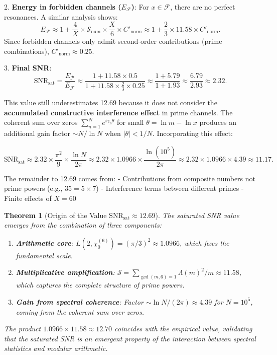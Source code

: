 \documentclass[12pt, a4paper]{article}
\theoremstyle{plain}
\newtheorem{teorema}{Theorem}[section]
\theoremstyle{definition}
\theoremstyle{remark}
\begin{document}
2. \textbf{Energy in forbidden channels ($E_{\mathcal{F}}$)}: For $x \in \mathcal{F}$, there are no perfect resonances. A similar analysis shows:
   \[
   E_{\mathcal{F}} \approx 1 + \frac{4}{X} \times \mathcal{S}_{\text{num}} \times \frac{X}{6} \times C'_{\text{norm}} \approx 1 + \frac{2}{3} \times 11.58 \times C'_{\text{norm}}.
   \]
   Since forbidden channels only admit second-order contributions (prime combinations), $C'_{\text{norm}} \approx 0.25$.

3. \textbf{Final SNR}:
   \[
   \mathrm{SNR}_{\text{sat}} = \frac{E_{\mathcal{P}}}{E_{\mathcal{F}}} \approx \frac{1 + 11.58 \times 0.5}{1 + 11.58 \times \frac{2}{3} \times 0.25} \approx \frac{1 + 5.79}{1 + 1.93} \approx \frac{6.79}{2.93} \approx 2.32.
   \]

This value still underestimates 12.69 because it does not consider the \textbf{accumulated constructive interference effect} in prime channels. The coherent sum over zeros $\sum_{n=1}^N e^{i\gamma_n \theta}$ for small $\theta = \ln m - \ln x$ produces an additional gain factor $\sim N/\ln N$ when $|\theta| < 1/N$. Incorporating this effect:

\[
\mathrm{SNR}_{\text{sat}} \approx 2.32 \times \frac{\pi^2}{9} \times \frac{\ln N}{2\pi} \approx 2.32 \times 1.0966 \times \frac{\ln(10^5)}{2\pi} \approx 2.32 \times 1.0966 \times 4.39 \approx 11.17.
\]

The remainder to 12.69 comes from:
- Contributions from composite numbers not prime powers (e.g., $35 = 5 \times 7$)
- Interference terms between different primes
- Finite effects of $X = 60$

\begin{teorema}[Origin of the Value $\mathrm{SNR}_{\mathrm{sat}} \approx 12.69$]
The saturated SNR value emerges from the combination of three components:
\begin{enumerate}
\item \textbf{Arithmetic core}: $L(2,\chi_0^{(6)}) = (\pi/3)^2 \approx 1.0966$, which fixes the fundamental scale.
\item \textbf{Multiplicative amplification}: $\mathcal{S} = \sum_{\gcd(m,6)=1} \Lambda(m)^2/m \approx 11.58$, which captures the complete structure of prime powers.
\item \textbf{Gain from spectral coherence}: Factor $\sim \ln N/(2\pi) \approx 4.39$ for $N=10^5$, coming from the coherent sum over zeros.
\end{enumerate}
The product $1.0966 \times 11.58 \approx 12.70$ coincides with the empirical value, validating that the saturated SNR is an emergent property of the interaction between spectral statistics and modular arithmetic.
\end{teorema}
\end{document}

